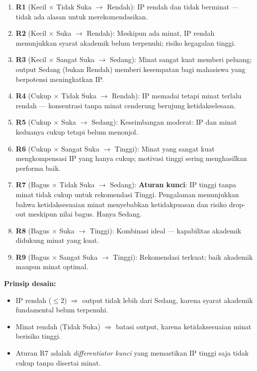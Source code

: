 \documentclass[conference]{IEEEtran}
\begin{document}
\begin{enumerate}[nosep]
  \item \textbf{R1} (Kecil $\times$ Tidak Suka $\to$ Rendah):
        IP rendah dan tidak berminat --- tidak ada alasan untuk
        merekomendasikan.
  \item \textbf{R2} (Kecil $\times$ Suka $\to$ Rendah):
        Meskipun ada minat, IP rendah menunjukkan syarat akademik
        belum terpenuhi; risiko kegagalan tinggi.
  \item \textbf{R3} (Kecil $\times$ Sangat Suka $\to$ Sedang):
        Minat sangat kuat memberi peluang; output Sedang (bukan
        Rendah) memberi kesempatan bagi mahasiswa yang berpotensi
        meningkatkan IP.
  \item \textbf{R4} (Cukup $\times$ Tidak Suka $\to$ Rendah):
        IP memadai tetapi minat terlalu rendah --- konsentrasi
        tanpa minat cenderung berujung ketidakselesaan.
  \item \textbf{R5} (Cukup $\times$ Suka $\to$ Sedang):
        Keseimbangan moderat: IP dan minat keduanya cukup tetapi
        belum menonjol.
  \item \textbf{R6} (Cukup $\times$ Sangat Suka $\to$ Tinggi):
        Minat yang sangat kuat mengkompensasi IP yang hanya cukup;
        motivasi tinggi sering menghasilkan performa baik.
  \item \textbf{R7} (Bagus $\times$ Tidak Suka $\to$ Sedang):
        \textbf{Aturan kunci}: IP tinggi tanpa minat tidak cukup
        untuk rekomendasi Tinggi. Pengalaman menunjukkan bahwa
        ketidaksesuaian minat menyebabkan ketidakpuasan dan risiko
        drop-out meskipun nilai bagus. Hanya Sedang.
  \item \textbf{R8} (Bagus $\times$ Suka $\to$ Tinggi):
        Kombinasi ideal --- kapabilitas akademik didukung minat
        yang kuat.
  \item \textbf{R9} (Bagus $\times$ Sangat Suka $\to$ Tinggi):
        Rekomendasi terkuat; baik akademik maupun minat optimal.
\end{enumerate}

\noindent
\textbf{Prinsip desain:}
\begin{itemize}[nosep,leftmargin=*]
  \item IP rendah ($\leq 2$) $\Rightarrow$ output tidak lebih dari Sedang,
        karena syarat akademik fundamental belum terpenuhi.
  \item Minat rendah (Tidak Suka) $\Rightarrow$ batasi output, karena
        ketidaksesuaian minat berisiko tinggi.
  \item Aturan R7 adalah \emph{differentiator kunci} yang memastikan
        IP tinggi saja tidak cukup tanpa disertai minat.
\end{itemize}
\end{document}

